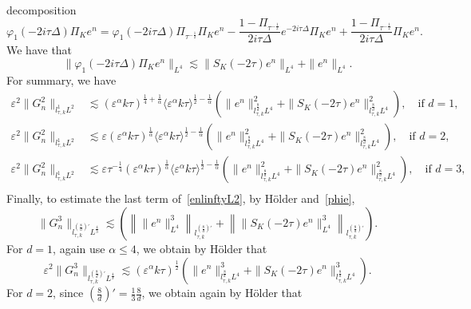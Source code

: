 \documentclass[10pt,a4paper]{article}
\begin{document}
  decomposition
  \[ \varphi_1(-2i\tau\Delta)\Pi_K e^n = \varphi_1(-2i\tau\Delta)\Pi_{\tau^{-\frac12}}\Pi_K e^n
  - \frac{1 - \Pi_{\tau^{-\frac12}}}{2i\tau\Delta} e^{-2i\tau\Delta}\Pi_K e^n
  + \frac{1 - \Pi_{\tau^{-\frac12}}}{2i\tau\Delta}\Pi_K e^n. \]
  We have that 
  \begin{equation}\label{phie}
    \|\varphi_1(-2i\tau\Delta)\Pi_K e^n\|_{L^4} 
    \lesssim \|S_K(-2\tau)e^n\|_{L^4} + 
    \|e^n\|_{L^4}.
  \end{equation}
  For summary, we have 
  \begin{equation}\label{G2}
    \begin{aligned}
      \varepsilon^2\|G_n^2\|_{l^1_{\tau,k}L^2} &\lesssim (\varepsilon^\alpha k\tau)^{\frac14+\frac1\alpha}
      \langle\varepsilon^\alpha k\tau\rangle^{\frac12-\frac1\alpha}
      \left(\|e^n\|^2_{l^\frac8d_{\tau,k}L^4} + \|S_K(-2\tau)e^n\|_{l^\frac8d_{\tau,k}L^4}^2\right),\quad \text{if }d=1,\\
      \varepsilon^2\|G_n^2\|_{l^1_{\tau,k}L^2} &\lesssim \varepsilon
      (\varepsilon^\alpha k\tau)^\frac1\alpha \langle\varepsilon^\alpha k\tau\rangle^{\frac12-\frac1\alpha}
      \left(\|e^n\|^2_{l^\frac8d_{\tau,k}L^4} + \|S_K(-2\tau)e^n\|_{l^\frac8d_{\tau,k}L^4}^2\right),\quad \text{if }d=2,\\
      \varepsilon^2\|G_n^2\|_{l^1_{\tau,k}L^2} &\lesssim \varepsilon \tau^{-\frac14}
      (\varepsilon^\alpha k\tau)^\frac1\alpha \langle\varepsilon^\alpha k\tau\rangle^{\frac12-\frac1\alpha}
      \left(\|e^n\|^2_{l^\frac8d_{\tau,k}L^4} + \|S_K(-2\tau)e^n\|_{l^\frac8d_{\tau,k}L^4}^2\right),\quad \text{if }d=3,\\
    \end{aligned}
  \end{equation}
  Finally, to estimate the last term of~\eqref{enlinftyL2}, by H\"older
  and~\eqref{phie},
  \[ \|G_n^3\|_{l^{(\frac8d)'}_{\tau,k}L^\frac43} \lesssim \left(
  \left\| \|e^n\|_{L^4}^3 \right\|_{l^{(\frac8d)'}_{\tau,k}} 
  + \left\| \|S_K(-2\tau)e^n \|_{L^4}^3 \right\|_{l^{(\frac8d)'}_{\tau,k}}\right). \]
  For \(d=1\), again use \(\alpha\leq4\), we obtain by H\"older that 
  \begin{equation}\label{G3d1}
    \varepsilon^2 \|G_n^3\|_{l^{(\frac8d)'}_{\tau,k}L^\frac43} \lesssim 
    (\varepsilon^\alpha k\tau)^\frac12 \left(
    \|e^n\|^3_{l^\frac8d_{\tau,k}L^4} + \|S_K(-2\tau)e^n\|_{l^\frac8d_{\tau,k}L^4}^3\right).
  \end{equation}
  For \(d=2\), since \((\frac8d)' = \frac13\frac8d\), we obtain again by
  H\"older that 
\end{document}
